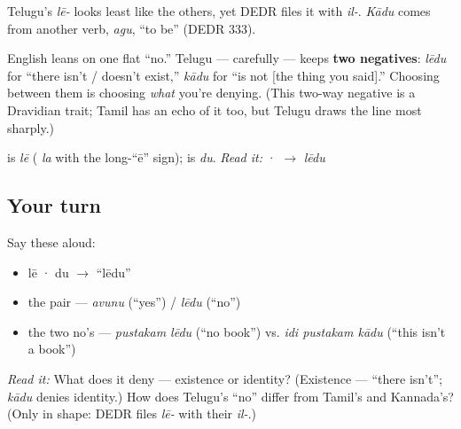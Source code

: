 \begin{cousinweb}
Telugu's \emph{lē-} looks least like the others, yet DEDR files it with \emph{il-}. \emph{Kādu} comes from another verb, \emph{agu}, \textquotedblleft{}to be\textquotedblright{} (DEDR 333).
\end{cousinweb}

\begin{grammarlens}[title={Grammar Lens: two \textquotedblleft{}no\textquotedblright{}s, existence vs. identity}]
English leans on one flat \textquotedblleft{}no.\textquotedblright{} Telugu — carefully — keeps \textbf{two negatives}: \emph{lēdu} for \textquotedblleft{}there isn't / doesn't exist,\textquotedblright{} \emph{kādu} for \textquotedblleft{}is not {[}the thing you said{]}.\textquotedblright{} Choosing between them is choosing \emph{what} you're denying. (This two-way negative is a Dravidian trait; Tamil has an echo of it too, but Telugu draws the line most sharply.)
\end{grammarlens}

\begin{sounds}
 is \emph{lē} ( \emph{la} with the long-“ē” sign);  is \emph{du}. \emph{Read it:} · $\to$ \emph{lēdu}
\end{sounds}

\subsection*{Your turn}
Say these aloud:

\begin{itemize}
\raggedright
  \item lē · du $\to$ \textquotedblleft{}lēdu\textquotedblright{}
  \item the pair — \emph{avunu} (\textquotedblleft{}yes\textquotedblright{}) / \emph{lēdu} (\textquotedblleft{}no\textquotedblright{})
  \item the two no's — \emph{pustakam lēdu} (\textquotedblleft{}no book\textquotedblright{}) vs. \emph{idi pustakam kādu} (\textquotedblleft{}this isn't a book\textquotedblright{})
\end{itemize}

\begin{tcolorbox}[breakable,colback=teal!4,colframe=teal!35!black,title={Before you move on}]
\emph{Read it:} \textbf{} What does it deny — existence or identity? (Existence — \textquotedblleft{}there isn't\textquotedblright{}; \emph{kādu} denies identity.) How does Telugu's \textquotedblleft{}no\textquotedblright{} differ from Tamil's and Kannada's? (Only in shape: DEDR files \emph{lē-} with their \emph{il-}.)
\end{tcolorbox}
